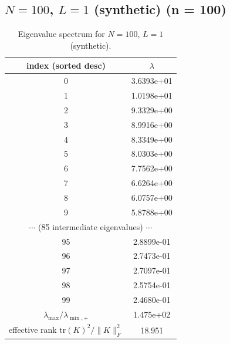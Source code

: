 \subsection*{$N=100$, $L=1$ (synthetic) \quad (n = 100)}
\begin{table}[H]
\centering
\caption{Eigenvalue spectrum for $N=100$, $L=1$ (synthetic).}
\begin{tabular}{c c}
\toprule
index (sorted desc) & $\lambda$ \\
\midrule
0 & 3.6393e+01 \\
1 & 1.0198e+01 \\
2 & 9.3329e+00 \\
3 & 8.9916e+00 \\
4 & 8.3349e+00 \\
5 & 8.0303e+00 \\
6 & 7.7562e+00 \\
7 & 6.6264e+00 \\
8 & 6.0757e+00 \\
9 & 5.8788e+00 \\
\multicolumn{2}{c}{$\cdots$ (85 intermediate eigenvalues) $\cdots$} \\
95 & 2.8899e-01 \\
96 & 2.7473e-01 \\
97 & 2.7097e-01 \\
98 & 2.5754e-01 \\
99 & 2.4680e-01 \\
\midrule
$\lambda_{\max}/\lambda_{\min, +}$ & 1.475e+02 \\
effective rank $\mathrm{tr}(K)^2/\|K\|_F^2$ & 18.951 \\
\bottomrule
\end{tabular}
\end{table}

